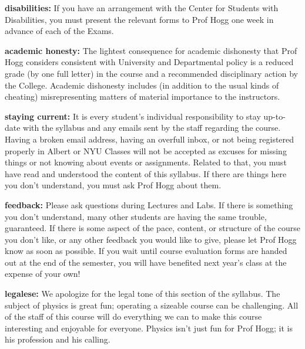 \documentclass[12pt, letterpaper]{article}
\renewcommand{\paragraph}[1]{\par\smallskip\noindent\textbf{#1}}
\begin{document}
\paragraph{disabilities:}
If you have an arrangement with the Center for Students with
Disabilities, you must present the relevant forms to Prof Hogg one
week in advance of each of the Exams.

\paragraph{academic honesty:}
The lightest consequence for academic dishonesty that Prof Hogg
considers consistent with University and Departmental policy is a
reduced grade (by one full letter) in the course and a recommended
disciplinary action by the College. Academic dishonesty includes (in
addition to the usual kinds of cheating) misrepresenting matters of
material importance to the instructors.

\paragraph{staying current:}
It is every student's individual responsibility to stay up-to-date
with the syllabus and any emails sent by the staff regarding the
course. Having a broken email address, having an overfull inbox, or
not being registered properly in Albert or NYU Classes will not be
accepted as excuses for missing things or not knowing about events or
assignments.
Related to that, 
you must have read and understood the content of this syllabus. If
there are things here you don't understand, you must ask Prof Hogg
about them.

\paragraph{feedback:}
Please ask questions during Lectures and Labs. If there is
something you don't understand, many other students are having the
same trouble, guaranteed. If there is some aspect of the pace,
content, or structure of the course you don't like, or any other
feedback you would like to give, please let Prof Hogg know as soon as
possible. If you wait until course evaluation forms are handed out at
the end of the semester, you will have benefited next year's class at
the expense of your own!

\paragraph{legalese:}
We apologize for the legal tone of this section of the syllabus. The
subject of physics is great fun; operating a sizeable course can be
challenging. All of the staff of this course will do everything we can
to make this course interesting and enjoyable for everyone. Physics
isn't just fun for Prof Hogg; it is his profession and his calling.
\end{document}
